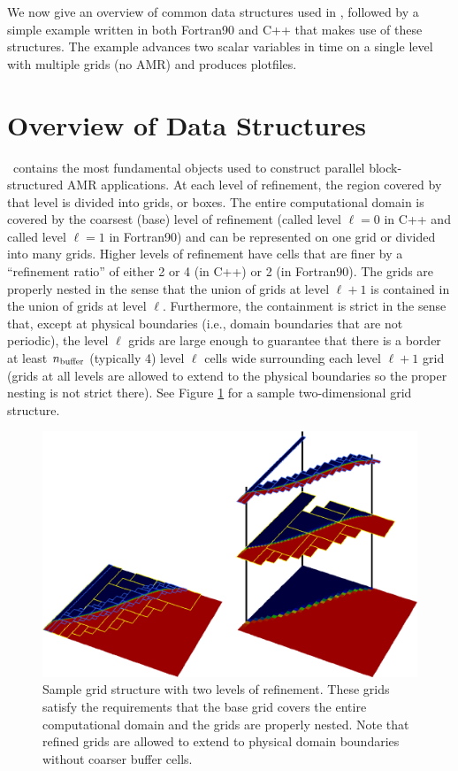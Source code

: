 We now give an overview of common data structures used in \BoxLib, followed by a simple
example written in both Fortran90 and C++ that makes use of these structures.
The example advances two scalar variables in time on a single level with multiple 
grids (no AMR) and produces plotfiles.

\section{Overview of Data Structures}

\BoxLib\ contains the most fundamental objects used to construct parallel
block-structured AMR applications.
At each level of refinement, the region covered by that level is divided
into grids, or boxes.  The entire computational domain is covered by
the coarsest (base) level of refinement (called level $\ell=0$ in C++ 
and called level $\ell=1$ in Fortran90) and can be represented on one
grid or divided into many grids.
Higher levels of refinement have cells that are finer by a ``refinement ratio''
of either 2 or 4 (in C++) or 2 (in Fortran90).  The grids are properly nested in the sense that the union 
of grids at level $\ell+1$ is contained in the union of grids at level $\ell$.
Furthermore, the containment is strict in the sense that, except at physical 
boundaries (i.e., domain boundaries that are not periodic),
the level $\ell$ grids are large enough to guarantee that there is
a border at least $n_{\rm buffer}$ (typically 4) level $\ell$ cells wide surrounding each level
$\ell +1$ grid (grids at all levels are allowed to extend to the physical
boundaries so the proper nesting is not strict there).  See Figure \ref{fig:AMR}
for a sample two-dimensional grid structure.\\
\begin{figure}[tb]
\centering
\includegraphics[width=6.5in]{./Introduction/AMR}
\caption{\label{fig:AMR}Sample grid structure with two levels of refinement.  These
grids satisfy the requirements that the base grid covers the entire computational domain 
and the grids are properly nested.  Note that refined grids are allowed to extend to physical
domain boundaries without coarser buffer cells.}
\end{figure}

